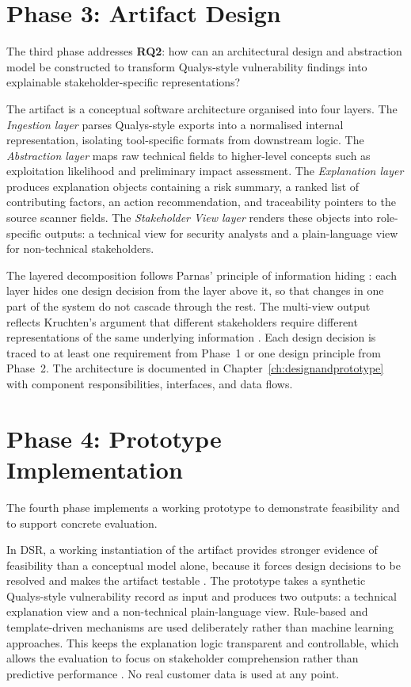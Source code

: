 \section{Phase 3: Artifact Design}
\label{sec:methods-phase3}

The third phase addresses \textbf{RQ2}: how can an architectural design and abstraction model be constructed to transform Qualys-style vulnerability findings into explainable stakeholder-specific representations?

The artifact is a conceptual software architecture organised into four layers. The \textit{Ingestion layer} parses Qualys-style exports into a normalised internal representation, isolating tool-specific formats from downstream logic. The \textit{Abstraction layer} maps raw technical fields to higher-level concepts such as exploitation likelihood and preliminary impact assessment. The \textit{Explanation layer} produces explanation objects containing a risk summary, a ranked list of contributing factors, an action recommendation, and traceability pointers to the source scanner fields. The \textit{Stakeholder View layer} renders these objects into role-specific outputs: a technical view for security analysts and a plain-language view for non-technical stakeholders.

The layered decomposition follows Parnas' principle of information hiding \cite{parnas1972modules}: each layer hides one design decision from the layer above it, so that changes in one part of the system do not cascade through the rest. The multi-view output reflects Kruchten's argument that different stakeholders require different representations of the same underlying information \cite{kruchten1995viewmodel}. Each design decision is traced to at least one requirement from Phase~1 or one design principle from Phase~2. The architecture is documented in Chapter~\ref{ch:designandprototype} with component responsibilities, interfaces, and data flows.

\section{Phase 4: Prototype Implementation}
\label{sec:methods-phase4}

The fourth phase implements a working prototype to demonstrate feasibility and to support concrete evaluation.

In DSR, a working instantiation of the artifact provides stronger evidence of feasibility than a conceptual model alone, because it forces design decisions to be resolved and makes the artifact testable \cite{hevner2004dsr}. The prototype takes a synthetic Qualys-style vulnerability record as input and produces two outputs: a technical explanation view and a non-technical plain-language view. Rule-based and template-driven mechanisms are used deliberately rather than machine learning approaches. This keeps the explanation logic transparent and controllable, which allows the evaluation to focus on stakeholder comprehension rather than predictive performance \cite{doshivelez2017rigorous}. No real customer data is used at any point.

